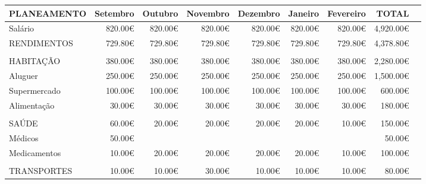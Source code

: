 \documentclass[a4paper,11pt]{report}
\begin{document}
		\begin{table}[!htp]\centering

			\scriptsize
			\begin{tabular}{lrrrrrrrr}\toprule
				PLANEAMENTO &Setembro &Outubro &Novembro &Dezembro &Janeiro &Fevereiro &TOTAL \\\midrule
				Salário &820.00€ &820.00€ &820.00€ &820.00€ &820.00€ &820.00€ &\cellcolor[HTML]{4285f4}4,920.00€ \\
				\cellcolor[HTML]{4285f4}RENDIMENTOS &\cellcolor[HTML]{4285f4}729.80€ &\cellcolor[HTML]{4285f4}729.80€ &\cellcolor[HTML]{4285f4}729.80€ &\cellcolor[HTML]{4285f4}729.80€ &\cellcolor[HTML]{4285f4}729.80€ &\cellcolor[HTML]{4285f4}729.80€ &\cellcolor[HTML]{4285f4}4,378.80€ \\
				& & & & & & & \\
				\cellcolor[HTML]{4285f4}HABITAÇÃO &\cellcolor[HTML]{4285f4}380.00€ &\cellcolor[HTML]{4285f4}380.00€ &\cellcolor[HTML]{4285f4}380.00€ &\cellcolor[HTML]{4285f4}380.00€ &\cellcolor[HTML]{4285f4}380.00€ &\cellcolor[HTML]{4285f4}380.00€ &\cellcolor[HTML]{4285f4}2,280.00€ \\
				Aluguer &250.00€ &250.00€ &250.00€ &250.00€ &250.00€ &250.00€ &\cellcolor[HTML]{4285f4}1,500.00€ \\
				Supermercado &100.00€ &100.00€ &100.00€ &100.00€ &100.00€ &100.00€ &\cellcolor[HTML]{4285f4}600.00€ \\
				Alimentação &30.00€ &30.00€ &30.00€ &30.00€ &30.00€ &30.00€ &\cellcolor[HTML]{4285f4}180.00€ \\
				& & & & & & & \\
				\cellcolor[HTML]{4285f4}SAÚDE &\cellcolor[HTML]{4285f4}60.00€ &\cellcolor[HTML]{4285f4}20.00€ &\cellcolor[HTML]{4285f4}20.00€ &\cellcolor[HTML]{4285f4}20.00€ &\cellcolor[HTML]{4285f4}20.00€ &\cellcolor[HTML]{4285f4}10.00€ &\cellcolor[HTML]{4285f4}150.00€ \\
				Médicos &50.00€ & & & & & &\cellcolor[HTML]{4285f4}50.00€ \\
				Medicamentos &10.00€ &20.00€ &20.00€ &20.00€ &20.00€ &10.00€ &\cellcolor[HTML]{4285f4}100.00€ \\
				& & & & & & & \\
				\cellcolor[HTML]{4285f4}TRANSPORTES &\cellcolor[HTML]{4285f4}10.00€ &\cellcolor[HTML]{4285f4}10.00€ &\cellcolor[HTML]{4285f4}30.00€ &\cellcolor[HTML]{4285f4}10.00€ &\cellcolor[HTML]{4285f4}10.00€ &\cellcolor[HTML]{4285f4}10.00€ &\cellcolor[HTML]{4285f4}80.00€ \\

\end{tabular}
\end{table}
\end{document}
